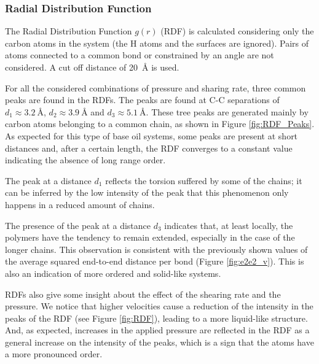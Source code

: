 \documentclass[aps,prb,reprint,superscriptaddress, a4paper]{revtex4-1}
\begin{document}
\subsubsection{Radial Distribution Function}

The Radial Distribution Function $g(r)$ (RDF) is calculated considering only the carbon atoms in the system (the H atoms and the surfaces are ignored). Pairs of atoms connected to a common bond or constrained by an angle are not considered. A cut off distance of \SI{20}{\angstrom} is used.

For all the considered combinations of pressure and sharing rate, three common peaks are found in the RDFs. The  peaks are found at C-C separations of $d_1  \approx \SI{3.2}{\angstrom}$,  $d_2 \approx \SI{3.9}{\angstrom}$ and $d_3 \approx \SI{5.1}{\angstrom}$. These tree peaks are generated mainly by carbon atoms belonging to a common chain, as shown in Figure \ref{fig:RDF_Peaks}. As expected for this type of base oil systems, some peaks are present  at short distances and, after a certain length, the RDF converges to a constant value indicating the absence of long range order.

The peak at a distance $d_1$ reflects the torsion suffered by some of the chains; it can be inferred by the low intensity of the peak that this phenomenon only happens in a reduced amount of chains. 

The presence of the peak at a distance $d_3$ indicates that, at least locally, the polymers have the tendency to remain extended, especially in the case of the longer chains. This observation is consistent with the previously shown values of the average squared end-to-end distance per bond (Figure \ref{fig:e2e2_v}). This is also an indication of more ordered and solid-like systems.

RDFs also give some insight about the effect of the shearing rate and the pressure. We notice that higher velocities cause a reduction of the intensity in  the peaks of the RDF (see Figure \ref{fig:RDF}), leading to a more liquid-like structure. And, as expected, increases in the applied pressure are reflected in the RDF as a general increase on the intensity of the peaks, which is a sign that the atoms have a more pronounced order.
\end{document}
